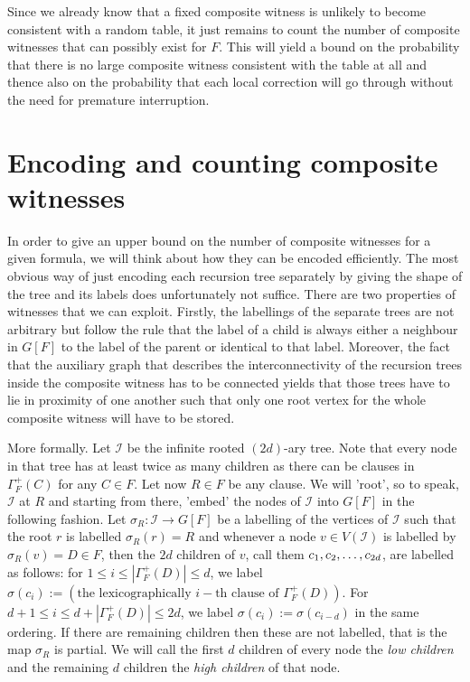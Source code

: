 \documentclass[11pt,a4paper]{article}
\begin{document}
Since we already know that a fixed composite witness is unlikely to become consistent with a random table, it just 
remains to count the number of composite witnesses that can possibly exist for $F$. This will yield a bound on the
probability that there is no large composite witness consistent with the table at all and thence also on the 
probability that each local correction will go through without the need for premature interruption.

\section{Encoding and counting composite witnesses}

In order to give an upper bound on the number of composite witnesses for a given formula, we will think about
how they can be encoded efficiently. The most obvious way of just encoding each recursion tree separately by
giving the shape of the tree and its labels does unfortunately not suffice. There are two properties of
witnesses that we can exploit. Firstly, the labellings of the separate trees are not arbitrary but follow the
rule that the label of a child is always either a neighbour in $G[F]$ to the label of the parent or identical
to that label. Moreover, the fact that the auxiliary graph that describes the interconnectivity of the recursion
trees inside the composite witness has to be connected yields that those trees have to lie in proximity of one
another such that only one root vertex for the whole composite witness will have to be stored.

More formally. Let $\mathcal{I}$ be the infinite rooted $(2d)$-ary tree. Note that every node in that tree
has at least twice as many children as there can be clauses in $\Gamma_F^+(C)$ for any $C \in F$. Let now
$R \in F$ be any clause. We will 'root', so to speak, $\mathcal{I}$ at $R$ and starting from there, 'embed' 
the nodes of $\mathcal{I}$ into $G[F]$ in the following fashion. Let $\sigma_R : \mathcal{I} \rightarrow G[F]$
be a labelling of the vertices of $\mathcal{I}$ such that the root $r$ is labelled $\sigma_R(r) = R$ and
whenever a node $v \in V(\mathcal{I})$ is labelled by $\sigma_R(v) = D \in F$, then the $2d$ children of $v$,
call them $c_1, c_2, \mathellipsis, c_{2d}$, are labelled as follows: for $1 \le i \le |\Gamma_F^+(D)| \le d$,
we label $\sigma(c_i) := (\mbox{the lexicographically } i-\mbox{th clause of } \Gamma_F^+(D))$.
For $d+1 \le i \le d+|\Gamma_F^+(D)| \le 2d$, we label $\sigma(c_i) := \sigma(c_{i-d})$ in the same
ordering. If there are remaining children then these are not labelled, that is the map $\sigma_R$ is partial. 
We will call the first $d$ children of every node the \emph{low children} and the remaining $d$ children the \emph{high children}
of that node.
\end{document}
